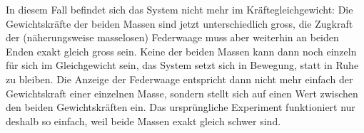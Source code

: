 \documentclass[addpoints,11pt,a4paper]{exam}
\begin{document}
\begin{questions}
\begin{taskbox}
\begin{parts}
\begin{solution}
In diesem Fall befindet sich das System nicht mehr im Kräftegleichgewicht:
Die Gewichtskräfte der beiden Massen sind jetzt unterschiedlich gross, die
Zugkraft der (näherungsweise masselosen) Federwaage muss aber weiterhin an
beiden Enden exakt gleich gross sein. Keine der beiden Massen kann dann
noch einzeln für sich im Gleichgewicht sein, das System setzt sich in
Bewegung, statt in Ruhe zu bleiben. Die Anzeige der Federwaage entspricht
dann nicht mehr einfach der Gewichtskraft einer einzelnen Masse, sondern
stellt sich auf einen Wert zwischen den beiden Gewichtskräften ein. Das
ursprüngliche Experiment funktioniert nur deshalb so einfach, weil beide
Massen exakt gleich schwer sind.
\end{solution}
\end{parts}
\end{taskbox}
\end{questions}
\end{document}
